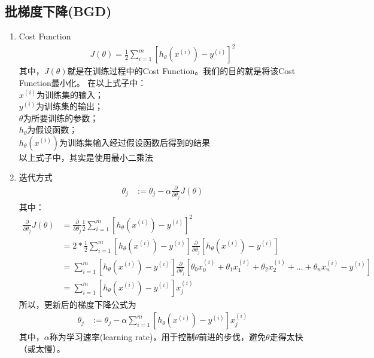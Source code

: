 \subsection{批梯度下降(BGD)}
\begin{enumerate}
	\item Cost Function
	\begin{equation}\begin{aligned}
		J(\theta) = \frac{1}{2} \sum_{i=1}^m \left[h_{\theta} {(x^{(i)})} - y^{(i)}\right]^2
	\end{aligned}\end{equation}
	其中，$J(\theta)$就是在训练过程中的Cost Function。我们的目的就是将该Cost Function最小化。
	在以上式子中：\\
		$x^{(i)}$为训练集的输入；\\
		$y^{(i)}$为训练集的输出；\\
		$\theta$为所要训练的参数；\\
		$h_{\theta}$为假设函数；\\
		$h_{\theta} {(x^{(i)})}$为训练集输入经过假设函数后得到的结果\\
		以上式子中，其实是使用最小二乘法

	\item 迭代方式
	\begin{equation}\begin{aligned}
	      \theta_j &:= \theta_j - \alpha \frac{\partial} {\partial \theta_j} J(\theta)
	\end{aligned}\end{equation}
	其中：
	\begin{equation}\begin{aligned}
	      \frac{\partial} {\partial \theta_j} J(\theta) &= \frac{\partial}{\partial \theta_j} \frac{1}{2} \sum_{i=1}^m\left[ h_\theta(x^{(i)}) - y^{(i)} \right]^2 \\
	      &= 2 * \frac{1}{2} \sum_{i=1}^m\left[ h_\theta(x^{(i)}) - y^{(i)} \right] \frac{\partial}{\partial\theta_j}\left[ h_\theta(x^{(i)}) - y^{(i)} \right] \\
	      &= \sum_{i=1}^m\left[ h_\theta(x^{(i)}) - y^{(i)} \right]\frac{\partial}{\partial\theta_j}\left[ \theta_0x_0^{(i)} +  \theta_1x_1^{(i)} + \theta_2x_2^{(i)} + ... + \theta_nx_n^{(i)} - y^{(i)} \right] \\
	      &= \sum_{i=1}^m\left[ h_\theta(x^{(i)}) - y^{(i)} \right]x_j^{(i)}
	\end{aligned}\end{equation}
	所以，更新后的梯度下降公式为
	\begin{equation}\begin{aligned}
		\theta_j &:= \theta_j - \alpha \sum_{i=1}^m \left[ h_\theta(x^{(i)}) - y^{(i)} \right]x_j^{(i)}
	\end{aligned}\end{equation}
	其中，$\alpha$称为学习速率(learning rate)，用于控制$\theta$前进的步伐，避免$\theta$走得太快（或太慢）。\\


\end{enumerate}
